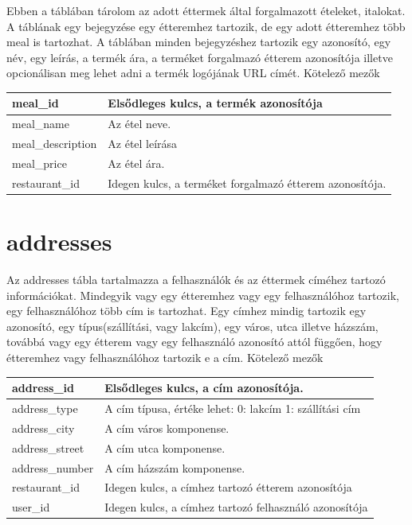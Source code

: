 Ebben a táblában tárolom az adott éttermek által forgalmazott ételeket, italokat. A táblának egy bejegyzése egy étteremhez tartozik, de egy adott étteremhez több meal is tartozhat. A táblában minden bejegyzéshez tartozik egy azonosító, egy név, egy leírás, a termék ára, a terméket forgalmazó étterem azonosítója illetve opcionálisan meg lehet adni a termék logójának URL címét.
Kötelező mezők

\begin{tabular}{|p{3cm}|p{10cm}|}
    \hline
    meal\_id & Elsődleges kulcs, a termék azonosítója \\
    \hline
    meal\_name & Az étel neve. \\
    \hline
    meal\_description & Az étel leírása \\
    \hline
    meal\_price & Az étel ára. \\
    \hline
    restaurant\_id & Idegen kulcs, a terméket forgalmazó étterem azonosítója. \\
    \hline
\end{tabular}

\section{addresses}

Az addresses tábla tartalmazza a felhasználók és az éttermek címéhez tartozó információkat. Mindegyik vagy egy étteremhez vagy egy felhasználóhoz tartozik, egy felhasználóhoz több cím is tartozhat. Egy címhez mindig tartozik egy azonosító, egy típus(szállítási, vagy lakcím), egy város, utca illetve házszám, továbbá vagy egy étterem vagy egy felhasználó azonosító attól függően, hogy étteremhez vagy felhasználóhoz tartozik e a cím.
Kötelező mezők

\begin{tabular}{|p{3cm}|p{10cm}|}
    \hline
    address\_id & Elsődleges kulcs, a cím azonosítója. \\
    \hline
    address\_type & A cím típusa, értéke lehet: 0: lakcím 1: szállítási cím \\
    \hline
    address\_city & A cím város komponense. \\
    \hline
    address\_street & A cím utca komponense. \\
    \hline
    address\_number & A cím házszám komponense. \\
    \hline
    restaurant\_id & Idegen kulcs, a címhez tartozó étterem azonosítója \\
    \hline
    user\_id & Idegen kulcs, a címhez tartozó felhasználó azonosítója \\
    \hline
\end{tabular}


